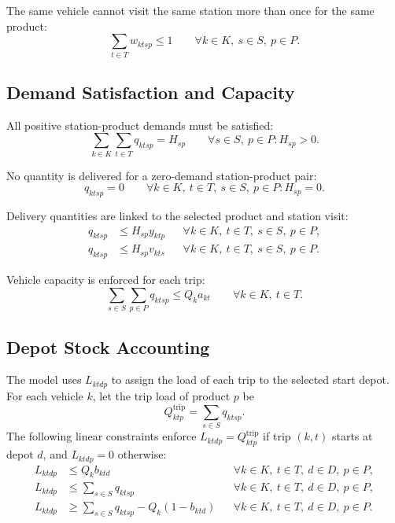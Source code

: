 \documentclass[11pt,a4paper]{article}
\begin{document}
The same vehicle cannot visit the same station more than once for the same
product:
\begin{equation}
    \sum_{t \in T} w_{ktsp} \leq 1
    \qquad \forall k \in K,\ s \in S,\ p \in P.
\label{eq:one-visit-station-product}
\end{equation}

\subsection{Demand Satisfaction and Capacity}

All positive station-product demands must be satisfied:
\begin{equation}
    \sum_{k \in K}\sum_{t \in T} q_{ktsp} = H_{sp}
    \qquad \forall s \in S,\ p \in P: H_{sp}>0.
\label{eq:demand}
\end{equation}

No quantity is delivered for a zero-demand station-product pair:
\begin{equation}
    q_{ktsp}=0
    \qquad \forall k \in K,\ t \in T,\ s \in S,\ p \in P: H_{sp}=0.
\label{eq:zero-demand}
\end{equation}

Delivery quantities are linked to the selected product and station visit:
\begin{align}
    q_{ktsp} &\leq H_{sp} y_{ktp}
        && \forall k \in K,\ t \in T,\ s \in S,\ p \in P, \label{eq:quantity-product}\\
    q_{ktsp} &\leq H_{sp} v_{kts}
        && \forall k \in K,\ t \in T,\ s \in S,\ p \in P. \label{eq:quantity-visit}
\end{align}

Vehicle capacity is enforced for each trip:
\begin{equation}
    \sum_{s \in S}\sum_{p \in P} q_{ktsp}
    \leq Q_k a_{kt}
    \qquad \forall k \in K,\ t \in T.
\label{eq:capacity}
\end{equation}

\subsection{Depot Stock Accounting}

The model uses \(L_{ktdp}\) to assign the load of each trip to the selected
start depot. For each vehicle \(k\), let the trip load of product \(p\) be
\[
    Q^{\mathrm{trip}}_{ktp} = \sum_{s \in S} q_{ktsp}.
\]
The following linear constraints enforce
\(L_{ktdp}=Q^{\mathrm{trip}}_{ktp}\) if trip \((k,t)\) starts at depot \(d\),
and \(L_{ktdp}=0\) otherwise:
\begin{align}
    L_{ktdp} &\leq Q_k b_{ktd}
        && \forall k \in K,\ t \in T,\ d \in D,\ p \in P, \label{eq:load-start}\\
    L_{ktdp} &\leq \sum_{s \in S} q_{ktsp}
        && \forall k \in K,\ t \in T,\ d \in D,\ p \in P, \label{eq:load-upper}\\
    L_{ktdp} &\geq \sum_{s \in S} q_{ktsp} - Q_k(1-b_{ktd})
        && \forall k \in K,\ t \in T,\ d \in D,\ p \in P. \label{eq:load-lower}
\end{align}
\end{document}
